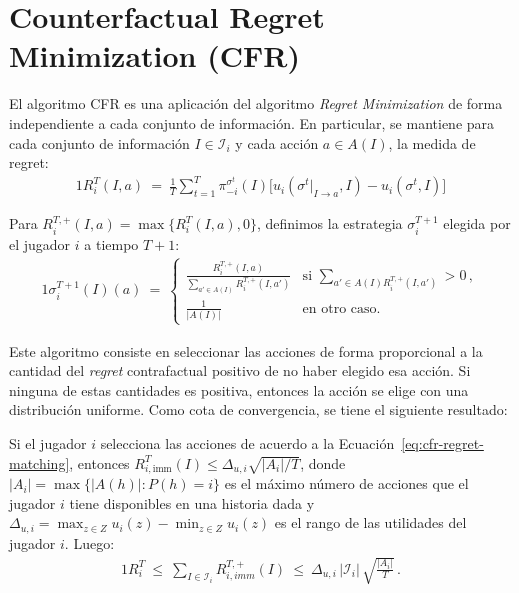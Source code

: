 \section{Counterfactual Regret Minimization (CFR)}
\label{section:cfr}

El algoritmo CFR es una aplicación del algoritmo \textit{Regret Minimization} de forma independiente a cada conjunto de información. En particular, se mantiene para cada conjunto de información $I \in \mathcal{I}_i$ y cada acción $a \in A(I)$, la medida de regret:
\begin{alignat}{1}
R_i^T(I, a)\ =\ \frac{1}{T} \sum_{t = 1}^T \pi^{\sigma^t}_{-i}(I)\biggl[u_i(\sigma^t|_{I \rightarrow a}, I) - u_i(\sigma^t, I)\biggr]
\end{alignat}

Para $R_i^{T, +}(I, a) = \max\{R_i^T(I, a), 0\}$, definimos la estrategia $\sigma^{T+1}_i$ elegida por el jugador $i$ a tiempo $T+1$:
\begin{alignat}{1}
\label{eq:cfr-regret-matching}
\sigma_i^{T+1}(I)(a)\ =\
\begin{cases}
\frac{R_i^{T, +}(I, a)}{\sum_{a' \in A(I)} R_i^{T, +}(I, a')} & \text{si } \sum_{a' \in A(I) R_i^{T, +}(I, a')} > 0 \,, \\
\frac{1}{|A(I)|} & \text{en otro caso.} 
\end{cases}
\end{alignat}

Este algoritmo consiste en seleccionar las acciones de forma proporcional a la cantidad del \textit{regret} contrafactual positivo de no haber elegido esa acción. Si ninguna de estas cantidades es positiva, entonces la acción se elige con una distribución uniforme. Como cota de convergencia, se tiene el siguiente resultado:

\begin{theorem}
Si el jugador $i$ selecciona las acciones de acuerdo a la Ecuación~\ref{eq:cfr-regret-matching}, entonces $R^T_{i, \text{imm}}(I) \leq \Delta_{u, i} \sqrt{|A_i|/T}$, donde $|A_i| = \max \{ |A(h)| : P(h) = i \}$ es el máximo número de acciones que el jugador $i$ tiene disponibles en una historia dada y  $\Delta_{u,i} = \max_{z \in Z}u_i(z) - \min_{z \in Z}u_i(z)$ es el rango de las utilidades del jugador $i$. Luego:
\begin{alignat}{1}
R_i^T\ \leq\ \sum_{I\in\mathcal{I}_i} R^{T,+}_{i,imm}(I) \ 
        \leq\ \Delta_{u,i}\,|\mathcal{I}_i|\,\sqrt{\frac{|A_i|}{T}} \,.
\end{alignat}
\end{theorem}


